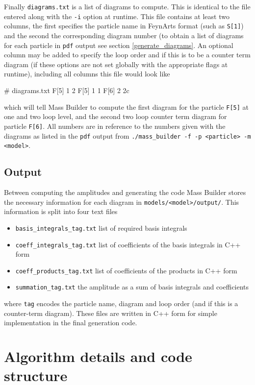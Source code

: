 Finally \lstinline{diagrams.txt} is a list of diagrams to compute.  This is identical to the file entered along with the \lstinline{-i} option at runtime.  This file contains at least two columns, the first specifies the particle name in FeynArts format (such as \lstinline{S[1]}) and the second the corresponding diagram number (to obtain a list of diagrams for each particle in \lstinline{pdf} output see section \ref{generate_diagrams}.  An optional column may be added to specify the loop order and if this is to be a counter term diagram (if these options are not set globally with the appropriate flags at runtime), including all columns this file would look like
\begin{lstterm}
# diagrams.txt
F[5]   1   2
F[5]   1   1
F[6]   2   2c
\end{lstterm}
which will tell Mass Builder to compute the first diagram for the particle \lstinline{F[5]} at one and two loop level, and the second two loop counter term diagram for particle \lstinline{F[6]}.  All numbers are in reference to the numbers given with the diagrams as listed in the \lstinline{pdf} output from \lstinline{./mass_builder -f -p <particle> -m <model>}.

\subsection{Output}

Between computing the amplitudes and generating the code Mass Builder stores the necessary information for each diagram in \lstinline{models/<model>/output/}.  This information is split into four text files
\begin{itemize}
\item \lstinline{basis_integrals_tag.txt} list of required basis integrals
\item \lstinline{coeff_integrals_tag.txt} list of coefficients of the basis integrals in C++ form
\item \lstinline{coeff_products_tag.txt} list of coefficients of the products in C++ form
\item \lstinline{summation_tag.txt} the amplitude as a sum of basis integrals and coefficients
\end{itemize}
where \lstinline{tag} encodes the particle name, diagram and loop order (and if this is a counter-term diagram).  These files are written in C++ form for simple implementation in the final generation code.



\section{Algorithm details and code structure}


